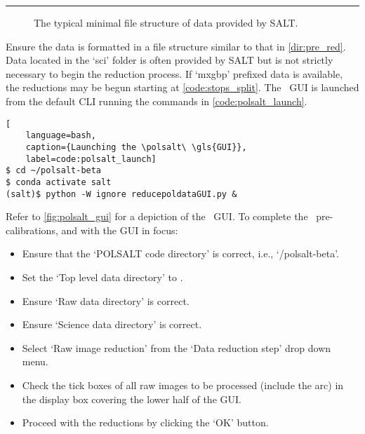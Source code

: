 \vspace{0.5\baselineskip}\hrule

\begin{figure}[h!]
    \centering
    \begin{minipage}{8cm}
    \end{minipage}
    \caption{The typical minimal file structure of data provided by \gls{SALT}.}
    \label{dir:pre_red}
\end{figure}

Ensure the data is formatted in a file structure similar to that in \autoref{dir:pre_red}. Data located in the `sci' folder is often provided by \gls{SALT} but is not strictly necessary to begin the reduction process. If `mxgbp' prefixed data is available, the reductions may be begun starting at \autoref{code:stops_split}. The \polsalt\ \gls{GUI} is launched from the default \gls{CLI} running the commands in \autoref{code:polsalt_launch}.

\begin{lstlisting}[
    language=bash,
    caption={Launching the \polsalt\ \gls{GUI}},
    label=code:polsalt_launch]
$ cd ~/polsalt-beta
$ conda activate salt
(salt)$ python -W ignore reducepoldataGUI.py &
\end{lstlisting}

Refer to \autoref{fig:polsalt_gui} for a depiction of the \polsalt\ \gls{GUI}. To complete the \polsalt\ pre-calibrations, and with the \gls{GUI} in focus:
\begin{itemize}
    \item Ensure that the `POLSALT code directory' is correct, i.e., `\mytilde/polsalt-beta'.
    \item Set the `Top level data directory' to \obsdate.
    \item Ensure `Raw data directory' is correct.
    \item Ensure `Science data directory' is correct.
    \item Select `Raw image reduction' from the `Data reduction step' drop down menu.
    \item Check the tick boxes of all raw images to be processed (include the arc) in the display box covering the lower half of the \gls{GUI}.
    \item Proceed with the reductions by clicking the `OK' button.
\end{itemize}

